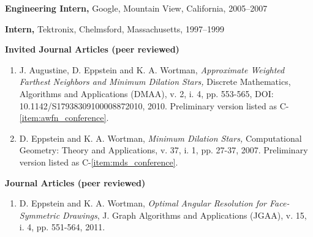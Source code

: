 \documentclass[11pt]{letter}
\begin{document}
\textbf{Engineering Intern,} Google, Mountain View, California, 2005--2007 %

\textbf{Intern,} Tektronix, Chelmsford, Massachusetts, 1997--1999 %

\clearpage
{}

\renewcommand{\labelenumi}{I-\arabic{enumi}.}
\textbf{Invited Journal Articles (peer reviewed)}
\begin{enumerate}
\item \label{item:awfn_journal} J. Augustine, D. Eppstein and K. A. Wortman, \emph{Approximate Weighted Farthest Neighbors and Minimum Dilation Stars,} Discrete Mathematics, Algorithms and Applications (DMAA), v. 2, i. 4, pp. 553-565, DOI: 10.1142/S17938309100008872010, 2010.  Preliminary version listed as C-\ref{item:awfn_conference}.
\item \label{item:mds_journal} D. Eppstein and K. A. Wortman, \emph{Minimum Dilation Stars,} Computational Geometry: Theory and Applications, v. 37, i. 1, pp. 27-37, 2007.  Preliminary version listed as C-\ref{item:mds_conference}.
\end{enumerate} 

\renewcommand{\labelenumi}{J-\arabic{enumi}.}
\textbf{Journal Articles (peer reviewed)}
\begin{enumerate}
\item \label{item:oarpdsf_journal} D. Eppstein and K. A. Wortman, \emph{Optimal Angular Resolution for Face-Symmetric Drawings}, J. Graph Algorithms and Applications (JGAA), v. 15, i. 4, pp. 551-564, 2011.
\end{enumerate}
\end{document}
